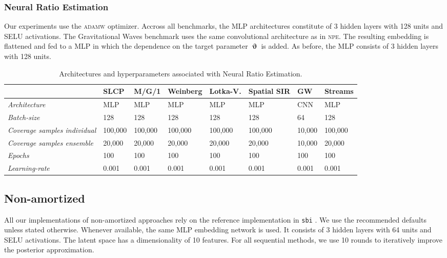 \documentclass[twoside]{article}
\DeclareMathOperator{\vtheta}{\boldsymbol\vartheta}
\begin{document}
\subsubsection{Neural Ratio Estimation}
Our experiments use the \textsc{adamw} \citep{adam,adamw} optimizer. Accross all benchmarks, the MLP architectures constitute of 3 hidden layers with 128 units and SELU \citep{selu} activations. The Gravitational Waves benchmark uses the same convolutional architecture as in \textsc{npe}. The resulting embedding is flattened and fed to a MLP in which the dependence on the target parameter $\vtheta$ is added. As before, the MLP consists of 3 hidden layers with 128 units.
\begin{table}[h!]
    \centering
    \begin{tabular}{llllllll}
        \toprule
        & SLCP & M/G/1 & Weinberg & Lotka-V. & Spatial SIR & GW & Streams \\
        \midrule
        \emph{Architecture} & MLP & MLP & MLP & MLP & MLP & CNN & MLP \\
        \emph{Batch-size} & 128 & 128 & 128 & 128 & 128 & 64 & 128 \\
        \emph{Coverage samples individual} & 100,000 & 100,000 & 100,000 & 100,000 & 100,000 & 10,000 & 100,000 \\
        \emph{Coverage samples ensemble} & 20,000 & 20,000 & 20,000 & 20,000 & 20,000 & 10,000 & 20,000 \\
        \emph{Epochs} & 100 & 100 & 100 & 100 & 100 & 100 & 100 \\
        \emph{Learning-rate} & 0.001 & 0.001 & 0.001 & 0.001 & 0.001 & 0.001 & 0.001 \\
        \bottomrule
    \end{tabular}
    \caption{Architectures and hyperparameters associated with Neural Ratio Estimation.}
    \label{tab:npe_hyperparameters}
\end{table}

\subsection{Non-amortized}
All our implementations of non-amortized approaches rely on the reference implementation in \texttt{sbi} \citep{sbi}. We use the recommended defaults unless stated otherwise. Whenever available, the same MLP embedding network is used. It consists of 3 hidden layers with 64 units and SELU \citep{selu} activations. The latent space has a dimensionality of 10 features. For all sequential methods, we use 10 rounds to iteratively improve the posterior approximation.
\end{document}
